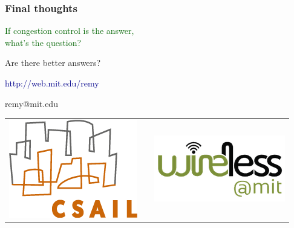 \documentclass[svgnames]{beamer}
\begin{document}
\begin{frame}

\frametitle{Final thoughts}

\begin{centering}

\LARGE \textcolor{DarkGreen}{If congestion control is the answer,\\what's the question?}

\vspace{\baselineskip}

\LARGE \textcolor{NavyBlue}{Are there better answers?}

\end{centering}

\vspace{\baselineskip}
\vspace{\baselineskip}

\begin{centering}

\textcolor{DarkBlue}{http://web.mit.edu/remy}

\vspace{7 pt}

remy@mit.edu

\end{centering}

\noindent \begin{tabular}{lp{5.5 cm}r}

\includegraphics[width=1.75 cm]{csaillogomed.png}
& & \includegraphics[width=2 cm]{wirelessmitlogo.png} \\

\end{tabular}

\end{frame}
\end{document}

